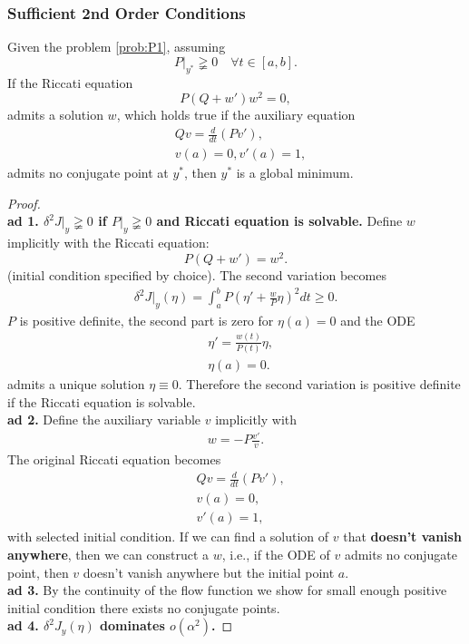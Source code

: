\subsubsection{Sufficient 2nd Order Conditions}
\begin{theorem}
Given the problem \eqref{prob:P1}, assuming
\begin{equation*}
	P|_{y^*} \gneqq 0 \quad \forall t \in [a, b]. 
\end{equation*}
If the Riccati equation
\begin{equation}
	P(Q + w')w^2 = 0, 
\end{equation}
admits a solution $w$, which holds true if the auxiliary equation
\begin{equation}
\begin{aligned}
	& Qv =  \frac{d}{dt} (Pv'),\\
	& v(a) = 0, v'(a) = 1,
\end{aligned}
\end{equation}
admits no conjugate point at $y^*$, then $y^*$ is a global minimum.  
\end{theorem}
\begin{proof}
\quad\\
\textbf{ad 1. $\delta^2J|_y \gneqq 0$ if $P|_y \gneqq 0$ and Riccati equation is solvable. }
	Define $w$ implicitly with the Riccati equation:
	\begin{equation}
		P(Q + w') = w^2. 
	\end{equation}
	(initial condition specified by choice).
	The second variation becomes
	\begin{align*}
		\delta^2 J|_y(\eta) = \int_a^b P( \eta ' + \frac{w}{P}\eta)^2 dt \ge  0. 
	\end{align*} 
	$P$ is positive definite, the second part is zero for $\eta(a) = 0$ and 
	the ODE
	\begin{align*}
		&\eta' = \frac{w(t)}{P(t)} \eta, \\
		&\eta(a) = 0.
	\end{align*} 
	admits a unique solution $\eta \equiv 0$.  Therefore the second variation is positive definite if the Riccati equation is solvable. 
	\quad\\
	\textbf{ad 2.} Define the auxiliary variable $v$ implicitly with 
	\begin{align*}
		w = -P \frac{v'}{v}.
	\end{align*}
	The original Riccati equation becomes 
	\begin{align*}
		& Qv = \frac{d}{dt}(P v'), \\
		& v(a) = 0,\\
		& v'(a) = 1,
	\end{align*}
	with selected initial condition. If we can find a solution of $v$ that \textbf{doesn't vanish anywhere}, then we can construct a $w$, i.e., if the ODE of $v$ admits no conjugate point, then $v$ doesn't vanish anywhere but the initial point $a$. \\
	 \textbf{ad 3.} By the continuity of the flow function we show for small enough positive initial condition there exists no conjugate points.\\
	 \textbf{ad 4. $\delta^2 J_y(\eta)$ dominates $o(\alpha^2)$.} 
\end{proof}
